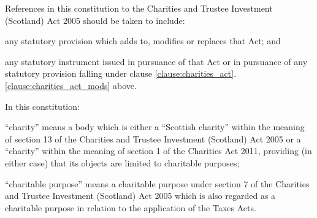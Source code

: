 ﻿\documentclass[a4paper,11pt,onecolumn ]{article}
\begin{document}
\begin{legal}
\item \label{clause:charities_act} References in this constitution to the Charities and Trustee Investment (Scotland) Act 2005 should be taken to include:
    \begin{legal}
    \item \label{clause:charities_act_mods} any statutory provision which adds to, modifies or replaces that Act; and 
    \item any statutory instrument issued in pursuance of that Act or in pursuance of any statutory provision falling under clause \ref{clause:charities_act}.\ref{clause:charities_act_mods} above.
    \end{legal}
\item In this constitution:
    \begin{legal}
    \item “charity” means a body which is either a “Scottish charity” within the meaning of section 13 of the Charities and Trustee Investment (Scotland) Act 2005 or a “charity” within the meaning of section 1 of the Charities Act 2011, providing (in either case) that its objects are limited to charitable purposes;
    \item “charitable purpose” means a charitable purpose under section 7 of the Charities and Trustee Investment (Scotland) Act 2005 which is also regarded as a charitable purpose in relation to the application of the Taxes Acts.
    \end{legal}
\end{legal}
\end{document}
